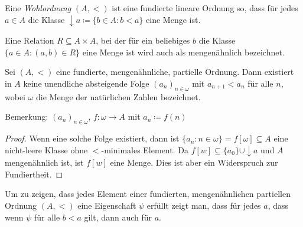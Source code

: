 \begin{definition}[Wohlordnungen]
	Eine \textit{Wohlordnung} $(A,<)$ ist eine fundierte lineare Ordnung so, dass für jedes $a\in A$ die Klasse $\downarrow a\coloneqq \{b\in A : b < a\}$ eine Menge ist.
\end{definition}

\begin{definition}[Mengenähnlichkeit]
	Eine Relation $R\subseteq A\times A$, bei der für ein beliebiges $b$ die Klasse $\{a\in A : (a,b)\in R\}$ eine Menge ist wird auch als mengenähnlich bezeichnet.
\end{definition}

\begin{lemma}
	Sei $(A,<)$ eine fundierte, mengenähnliche, partielle Ordnung. Dann existiert in $A$ keine unendliche absteigende Folge $(a_n)_{n\in \omega}$ mit $a_{n+1}<a_n$ für alle $n$, wobei $\omega$ die Menge der natürlichen Zahlen bezeichnet.
\end{lemma}

Bemerkung: $(a_n)_{n\in \omega}$, $f:\omega \to A$ mit $a_n\coloneqq f(n)$

\begin{proof}
	Wenn eine solche Folge existiert, dann ist $\{a_n : n\in \omega\}=f[\omega]\subseteq A$ eine nicht-leere Klasse ohne $<$-minimales Element. Da $f[w]\subseteq \{a_0\}\cup \downarrow a$ und $A$ mengenähnlich ist, ist $f[w]$ eine Menge. Dies ist aber ein Widerspruch zur Fundiertheit.
\end{proof}

Um zu zeigen, dass jedes Element einer fundierten, mengenähnlichen partiellen Ordnung $(A,<)$ eine Eigenschaft $\psi$ erfüllt zeigt man, dass für jedes $a$, dass wenn $\psi$ für alle $b<a$ gilt, dann auch für $a$.

